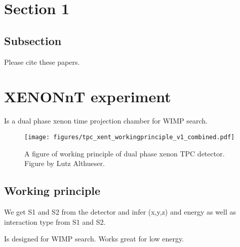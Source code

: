 \section{Section 1}
\subsection{Subsection}

Please cite these papers\cite{PhysRevLett.126.091301,PhysRevD.103.063028}.

\section{XENONnT experiment}

Is a dual phase xenon time projection chamber for WIMP search\cite{Aprile_2020}.

\begin{figure}[h!]
\begin{center}
\texttt{[image: figures/tpc\_xent\_workingprinciple\_v1\_combined.pdf]}
\end{center}
\caption{ A figure of working principle of dual phase xenon TPC detector. Figure by Lutz Althueser.  }\label{fig:1}
\end{figure}

\subsection{Working principle}
We get S1 and S2 from the detector and infer (x,y,z) and energy as well as interaction type from S1 and S2.

Is designed for WIMP search. Works great for low energy.
